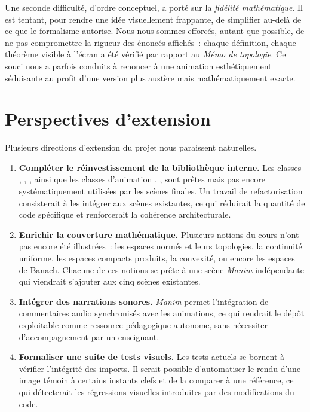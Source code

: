 \documentclass[12pt, a4paper, openany]{report}
\begin{document}
	Une seconde difficulté, d’ordre conceptuel, a porté sur la \emph{fidélité mathématique}. Il est tentant, pour rendre une idée visuellement frappante, de simplifier au-delà de ce que le formalisme autorise. Nous nous sommes efforcés, autant que possible, de ne pas compromettre la rigueur des énoncés affichés~: chaque définition, chaque théorème visible à l’écran a été vérifié par rapport au \textit{Mémo de topologie}. Ce souci nous a parfois conduits à renoncer à une animation esthétiquement séduisante au profit d’une version plus austère mais mathématiquement exacte.

	\section{Perspectives d’extension}

	Plusieurs directions d’extension du projet nous paraissent naturelles.

	\begin{enumerate}
		\item \textbf{Compléter le réinvestissement de la bibliothèque interne.} Les classes , , ,  ainsi que les classes d’animation , ,  sont prêtes mais pas encore systématiquement utilisées par les scènes finales. Un travail de refactorisation consisterait à les intégrer aux scènes existantes, ce qui réduirait la quantité de code spécifique et renforcerait la cohérence architecturale.
		\item \textbf{Enrichir la couverture mathématique.} Plusieurs notions du cours n’ont pas encore été illustrées~: les espaces normés et leurs topologies, la continuité uniforme, les espaces compacts produits, la convexité, ou encore les espaces de Banach. Chacune de ces notions se prête à une scène \textit{Manim} indépendante qui viendrait s’ajouter aux cinq scènes existantes.
		\item \textbf{Intégrer des narrations sonores.} \textit{Manim} permet l’intégration de commentaires audio synchronisés avec les animations, ce qui rendrait le dépôt exploitable comme ressource pédagogique autonome, sans nécessiter d’accompagnement par un enseignant.
		\item \textbf{Formaliser une suite de tests visuels.} Les tests actuels se bornent à vérifier l’intégrité des imports. Il serait possible d’automatiser le rendu d’une image témoin à certains instants clefs et de la comparer à une référence, ce qui détecterait les régressions visuelles introduites par des modifications du code.
	\end{enumerate}
\end{document}
